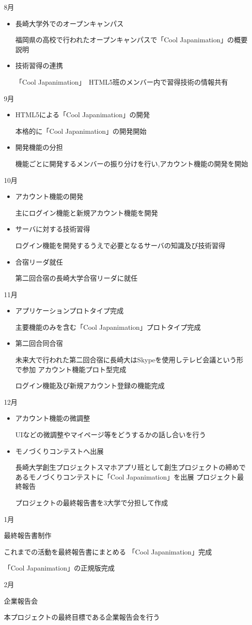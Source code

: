 8月
\begin{itemize}
\item 長崎大学外でのオープンキャンパス
\par 福岡県の高校で行われたオープンキャンパスで「Cool Japanimation」の概要説明
\item 技術習得の連携
\par 「Cool Japanimation」　HTML5班のメンバー内で習得技術の情報共有
\end{itemize}
9月
\begin{itemize}
\item HTML5による「Cool Japanimation」の開発
\par 本格的に「Cool Japanimation」の開発開始
\item 開発機能の分担
\par 機能ごとに開発するメンバーの振り分けを行い,アカウント機能の開発を開始
\end{itemize}
10月
\begin{itemize}
\item アカウント機能の開発
\par 主にログイン機能と新規アカウント機能を開発
\item サーバに対する技術習得
\par ログイン機能を開発するうえで必要となるサーバの知識及び技術習得
\item 合宿リーダ就任
\par 第二回合宿の長崎大学合宿リーダに就任
\end{itemize}
11月
\begin{itemize}
\item アプリケーションプロトタイプ完成
\par 主要機能のみを含む「Cool Japanimation」プロトタイプ完成
\item 第二回合同合宿
\par 未来大で行われた第二回合宿に長崎大はSkypeを使用しテレビ会議という形で参加
\items アカウント機能プロト型完成
\par ログイン機能及び新規アカウント登録の機能完成
\end{itemize}
12月
\begin{itemize}
\item アカウント機能の微調整
\par UIなどの微調整やマイページ等をどうするかの話し合いを行う
\item モノづくりコンテストへ出展
\par 長崎大学創生プロジェクトスマホアプリ班として創生プロジェクトの締めであるモノづくりコンテストに「Cool Japanimation」を出展
\items プロジェクト最終報告
\par プロジェクトの最終報告書を3大学で分担して作成
\end{itemize}
1月
\begin{itemize}
\items 最終報告書制作
\par これまでの活動を最終報告書にまとめる
\items 「Cool Japanimation」完成
\par 「Cool Japanimation」の正規版完成
\end{itemize}
2月
\begin{itemize}
\items 企業報告会
\par 本プロジェクトの最終目標である企業報告会を行う
\end{itemize}
